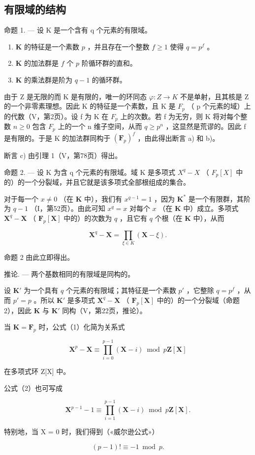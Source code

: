 \subsection{有限域的结构}

命题 1. --- 设 K 是一个含有 q 个元素的有限域。

\begin{enumerate}
\def\labelenumi{\alph{enumi})}
\item
  \(\mathbf{K}\) 的特征是一个素数 \(p\) ，并且存在一个整数 \(f \geqslant 1\) 使得 \(q = p^f\) 。
\item
  \(\mathbf{K}\) 的加法群是 \(f\) 个 \(p\) 阶循环群的直和。
\item
  \(\mathbf{K}\) 的乘法群是阶为 \(q - 1\) 的循环群。
\end{enumerate}

由于 Z 是无限的而 K 是有限的，唯一的环同态 \(\varphi:Z\to K\) 不是单射，且其核是 Z 的一个非零素理想。因此 K 的特征是一个素数，且 K 是 \(F_{p}\) （ p 个元素的域）上的代数（V，第2页）。设 f 为 K 在 \(F_{p}\) 上的次数。若 f 为无穷，则 K 将对每个整数 \(n\geqslant0\) 包含 \(F_{p}\) 上的一个 n 维子空间，从而 \(q\geqslant p^{n}\) ，这显然是荒谬的。因此 f 是有限的。于是 K 的加法群同构于 \((\mathbf{F}_{p})^{f}\) ，由此得出断言 a) 和 b)。

断言 c) 由引理 1（V，第78页）得出。

命题 2. --- 设 K 为含 q 个元素的有限域。域 K 是多项式 \(X^{q}-X\) （ \(F_{p}[X]\) 中的）的一个分裂域，并且它就是该多项式全部根组成的集合。

对于每一个 \(x \neq 0\) （在 \(\mathbf{K}\) 中），我们有 \(x^{q-1} = 1\) ，因为 \(\mathbf{K}^*\) 是一个有限群，其阶为 \(q - 1\) （I，第52页）。由此可知 \(x^q = x\) 对每个 \(x\) （在 \(\mathbf{K}\) 中）成立。多项式 \(\mathbf{X}^q - \mathbf{X}\) （ \(\mathbf{F}_p[\mathbf{X}]\) 中的）的次数为 \(q\) ，且它有 \(q\) 个根（在 \(\mathbf{K}\) 中），从而

\[
\mathbf {X} ^ {q} - \mathbf {X} = \prod_ {\xi \in K} (\mathbf {X} - \xi).\tag{1}
\]

命题 2 由此立即得出。

推论. --- 两个基数相同的有限域是同构的。

设 \(\mathbf{K}'\) 为一个具有 \(q\) 个元素的有限域；其特征是一个素数 \(p'\) ，它整除 \(q = p^f\) ，从而 \(p' = p\) 。所以 \(\mathbf{K}'\) 是多项式 \(\mathbf{X}^q - \mathbf{X}\) （ \(\mathbf{F}_p[\mathbf{X}]\) 中的）的一个分裂域（命题 2），因此 \(\mathbf{K}\) 与 \(\mathbf{K}'\) 同构（V，第22页，推论）。

当 \(\mathbf{K} = \mathbf{F}_p\) 时，公式（1）化简为关系式

\[
\mathbf {X} ^ {p} - \mathbf {X} \equiv \prod_ {i = 0} ^ {p - 1} (\mathbf {X} - i) \bmod p \mathbf {Z} [ \mathbf {X} ]\tag{2}
\]

在多项式环 Z{[}X{]} 中。

公式（2）也可写成

\[
\mathbf {X} ^ {p - 1} - 1 \equiv \prod_ {i = 1} ^ {p - 1} (\mathbf {X} - i) \bmod p \mathbf {Z} [ \mathbf {X} ].\tag{3}
\]

特别地，当 X = 0 时，我们得到（«威尔逊公式»）

\[
(p - 1)! \equiv - 1 \bmod p.\tag{4}
\]

